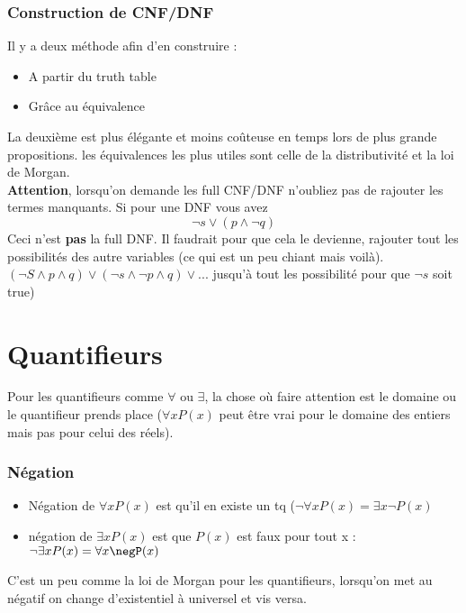 \subsubsection{Construction de CNF/DNF}
Il y a deux méthode afin d'en construire :
\begin{itemize}
    \item A partir du truth table
    \item Grâce au équivalence
\end{itemize}
La deuxième est plus élégante et moins coûteuse en temps lors de plus grande propositions. les équivalences les plus utiles sont celle de la distributivité et la loi de Morgan. 
\\
\textbf{Attention}, lorsqu'on demande les full CNF/DNF n'oubliez pas de rajouter les termes manquants. Si pour une DNF vous avez \begin{equation*}
    \neg s \vee (p \wedge \neg q)
\end{equation*}
Ceci n'est \textbf{pas} la full DNF. Il faudrait pour que cela le devienne, rajouter tout les possibilités des autre variables (ce qui est un peu chiant mais voilà). $(\neg S \wedge p \wedge q) \vee (\neg s \wedge \neg p \wedge q )\vee ... $  jusqu'à tout les possibilité pour que $\neg s$ soit true)

\section{Quantifieurs}
Pour les quantifieurs comme $\forall$ ou $\exists$, la chose où faire attention est le domaine ou le quantifieur prends place ($\forall x P(x)$ peut être vrai pour le domaine des entiers mais pas pour celui des réels).
\subsubsection{Négation}
\begin{itemize}
    \item Négation de $\forall x P(x)$ est qu'il en existe un tq ($\neg\forall x P(x) = \exists x \neg P(x)$
    \item négation de $\exists x P(x)$ est que $P(x)$ est faux pour tout x : $\neg\exists x P(x) = \forall x \negP(x)$
\end{itemize}
C'est un peu comme la loi de Morgan pour les quantifieurs, lorsqu'on met au négatif on change d'existentiel à universel et vis versa.

